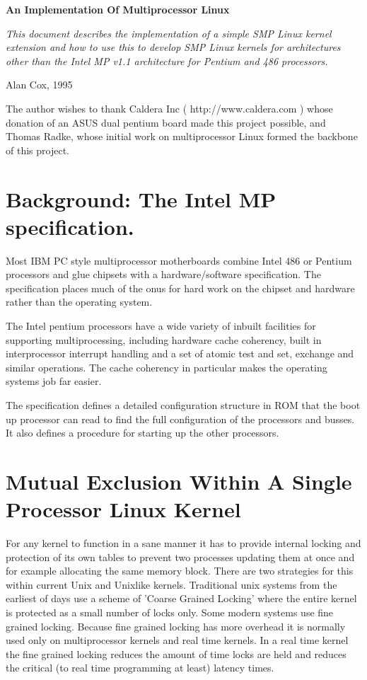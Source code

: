 \documentclass[]{article}
\begin{document}
\begin{center}
\LARGE \bf
An Implementation Of Multiprocessor Linux
\normalsize
\end{center}

{ \it
This document describes the implementation of a simple SMP 
Linux kernel extension and how to use this to develop SMP Linux kernels for 
architectures other than the Intel MP v1.1 architecture for Pentium and 486 
processors.}

\hfill Alan Cox, 1995


The author wishes to thank Caldera Inc ( http://www.caldera.com )
whose donation of an ASUS dual pentium board made this project possible, 
and Thomas Radke, whose initial work on multiprocessor Linux formed 
the backbone of this project.

\section{Background: The Intel MP specification.}
Most IBM PC style multiprocessor motherboards combine Intel 486 or Pentium 
processors and glue chipsets with a hardware/software specification. The 
specification places much of the onus for hard work on the chipset and 
hardware rather than the operating system.

The Intel pentium processors have a wide variety of inbuilt facilities for 
supporting multiprocessing, including hardware cache coherency, built in 
interprocessor interrupt handling and a set of atomic test and set, 
exchange and similar operations. The cache coherency in particular makes the 
operating systems job far easier.

The specification defines a detailed configuration structure in ROM that 
the boot up processor can read to find the full configuration of the 
processors and busses. It also defines a procedure for starting up the 
other processors.


\section{Mutual Exclusion Within A Single Processor Linux Kernel}
For any kernel to function in a sane manner it has to provide internal 
locking and protection of its own tables to prevent two processes updating 
them at once and for example allocating the same memory block. There are 
two strategies for this within current Unix and Unixlike kernels. 
Traditional unix systems from the earliest of days use a scheme of 'Coarse 
Grained Locking' where the entire kernel is protected as a small number of 
locks only. Some modern systems use fine grained locking. Because fine 
grained locking has more overhead it is normally used only on 
multiprocessor kernels and real time kernels. In a real time kernel the 
fine grained locking reduces the amount of time locks are held and reduces 
the critical (to real time programming at least) latency times.
\end{document}
